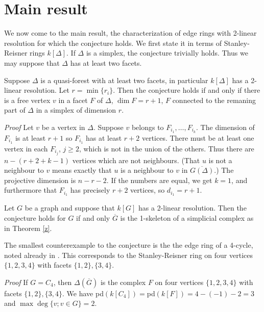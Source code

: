 \documentclass[11pt, oneside]{article}   	%
\begin{document}
 \section{Main result}
 We now come to the main result, the characterization of edge rings with 2-linear resolution for which the conjecture holds.
 We first state it in terms of Stanley-Reisner rings $k[\Delta]$.
 If $\Delta$ is a simplex, the conjecture trivially holds. Thus we may suppose that $\Delta$ has at least two facets.
 
 \begin{theorem}\label{z}
 Suppose $\Delta$ is a quasi-forest with at least two facets, in particular $k[\Delta]$ has a 2-linear resolution. 
 Let $r=\min\{ r_i\}$. Then the conjecture holds if and only if there is a free vertex $v$ in a facet $F$ of $\Delta$, $\dim F=r+1$, 
 $F$ connected to the remaning part of $\Delta$ in a simplex of dimension $r$.
 \end{theorem}
 
 \noindent
 {\em Proof} Let $v$ be a vertex in $\Delta$. Suppose $v$ belongs to $F_{i_1},\ldots,F_{i_k}$. The dimension of $F_{i_1}$ is at least
 $r+1$ so $F_{i_1}$ has at least $r+2$ vertices. There must be at least one vertex in each $F_{i_j}$, $j\ge2$,
 which is not in the union of the others. Thus there are $n-(r+2+k-1)$ vertices which are not neighbours. (That $u$ is not a neighbour
 to $v$ means exactly that $u$ is a neighbour to $v$ in $\overline{G(\Delta)}$.) The projective dimension is $n-r-2$. 
 If the numbers are equal, we get $k=1$, and furthermore that $F_{i_1}$ has precisely $r+2$ vertices, so $d_{i_1}=r+1$.

\begin{cor}\label{x}
Let $G$ be a graph and suppose that $k[G]$ has a 2-linear resolution. Then the conjecture holds for $G$ if and only
$\overline G$ is the 1-skeleton of a simplicial complex as in Theorem \ref{z}.
\end{cor}

\begin{cor}
The smallest counterexample to the conjecture is the the edge ring of a 4-cycle, noted already in \cite{k-m}.
This corresponds to the Stanley-Reisner ring on four vertices $\{1,2,3,4\}$ with facets $\{1,2\},\{3,4\}$. 
\end{cor}

\noindent
{\em Proof} If $G=C_4$, then $\Delta(\overline G)$ is the complex $F$ on four vertices $\{1,2,3,4\}$ with facets $\{1,2\},\{3,4\}$. 
We have pd$(k[C_4])=$pd$(k[F])=4-(-1)-2=3$ and $\max\deg\{v;v\in G\}=2$.
\end{document}
